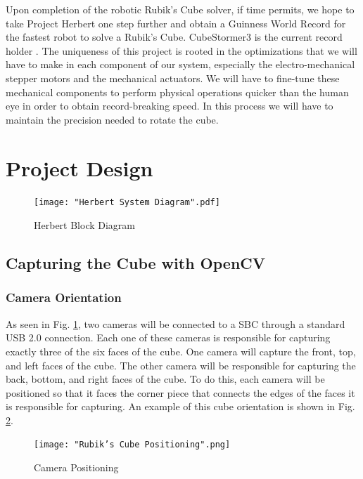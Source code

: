 \documentclass[final, letterpaper, 10 pt, conference, onecolumn]{IEEEtran}
\begin{document}
Upon completion of the robotic Rubik's Cube solver, if time permits, we hope to take Project Herbert one step further and obtain a Guinness World Record for the fastest robot to solve a Rubik's Cube. CubeStormer3 is the current record holder \cite{GuinnessWR}. The uniqueness of this project is rooted in the optimizations that we will have to make in each component of our system, especially the electro-mechanical stepper motors and the mechanical actuators. We will have to fine-tune these mechanical components to perform physical operations quicker than the human eye in order to obtain record-breaking speed. In this process we will have to maintain the precision needed to rotate the cube.

\section{Project Design}
\label{sec:Project Design}

\begin{figure}[!ht]
\centering
\texttt{[image: "Herbert System Diagram".pdf]}
\caption{Herbert Block Diagram}
\label{fig:System Block Diagram}
\end{figure}

\subsection{Capturing the Cube with OpenCV}
\label{sec:opencv}

\subsubsection{Camera Orientation}
As seen in Fig. \ref{fig:System Block Diagram}, two cameras will be connected to a SBC through a standard USB 2.0 connection. Each one of these cameras is responsible for capturing exactly three of the six faces of the cube. One camera will capture the front, top, and left faces of the cube. The other camera will be responsible for capturing the back, bottom, and right faces of the cube. To do this, each camera will be positioned so that it faces the corner piece that connects the edges of the faces it is responsible for capturing. An example of this cube orientation is shown in Fig. \ref{fig:Camera Positioning}.

\begin{figure}[!ht]
\centering
\texttt{[image: "Rubik's Cube Positioning".png]}
\caption{Camera Positioning}
\label{fig:Camera Positioning}
\end{figure}
\end{document}
